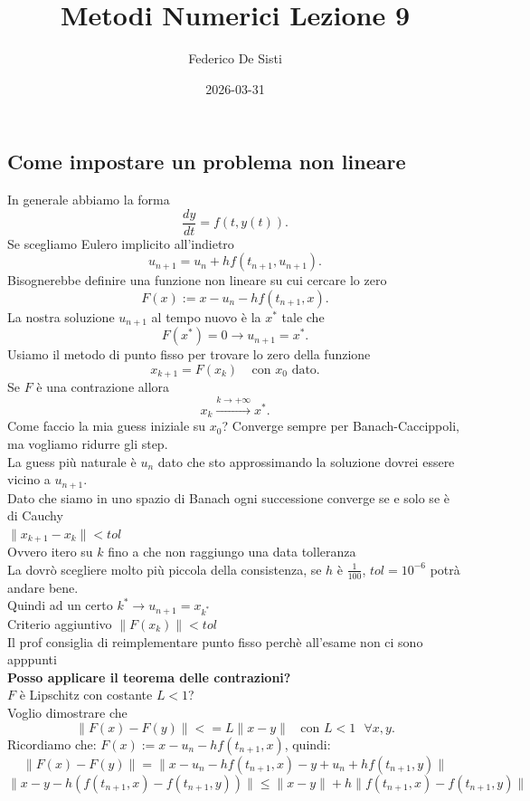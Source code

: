 \documentclass[12px]{article}
\title{Metodi Numerici Lezione 9}
\date{2026-03-31}
\author{Federico De Sisti}
\begin{document}
	\maketitle
	\newpage
	\subsection{Come impostare un problema non lineare}
	In generale abbiamo la forma 
	\[
		\frac{dy}{dt} =f (t,y(t))
	.\] 
	Se scegliamo Eulero implicito all'indietro
	\[
		u_{n+1} = u_n + hf(t_{n+1},u_{n+1})
	.\] 
	Bisognerebbe definire una funzione non lineare su cui cercare lo zero
	\[
		F(x) :=  x - u_n - hf(t_{n+1},x)
	.\] 
	La nostra soluzione $u_{n+1}$ al tempo nuovo è la  $x^*$ tale che
	\[
		F(x^*) = 0 \rightarrow u_{n+1} = x^*
	.\] 
	Usiamo il metodo di punto fisso per trovare lo zero della funzione
	\[
		x_{k+1} = F(x_k) \ \ \ \ \ \text{con }x_0 \text{ dato}
	.\] 
	Se $F$ è una contrazione allora
	\[
		x_k \xrightarrow{k \rightarrow +\infty} x^*
	.\] 
	Come faccio la mia guess iniziale su $x_0$? Converge sempre per Banach-Caccippoli, ma vogliamo ridurre gli step.\\
	La guess più naturale è $u_n$ dato che sto approssimando la soluzione dovrei essere vicino a  $u_{n+1}$.\\
	Dato che siamo in uno spazio di Banach ogni successione converge se e solo se è di Cauchy\\
	$\|x_{k+1}-x_k\| < tol$ \\
	Ovvero itero su $k$ fino a che non raggiungo una data tolleranza\\
	La dovrò scegliere molto più piccola della consistenza, se $h$ è $\frac 1 {100}$,  $tol = 10^{-6}$ potrà andare bene.\\
	Quindi  ad un certo $k^* \rightarrow u_{n+1} = x_{k^*}$\\
	Criterio aggiuntivo $\|F(x_k)\|<tol$\\
	Il prof consiglia di reimplementare punto fisso perchè all'esame non ci sono apppunti\\
	\textbf{Posso applicare il teorema delle contrazioni?}\\
	$F$ è Lipschitz con costante $L < 1$?\\
	Voglio dimostrare che 
	\[
		\|F(x) - F(y)\| <= L\|x-y\| \ \ \ \ \text{con } L < 1 \ \ \ \forall x,y
	.\] 
	 Ricordiamo che:
	 $F(x) :=  x - u_n - hf(t_{n+1},x)$, quindi:
	 \[
	 \|F(x) - F(y)\| = \|x - u_n - hf(t_{n+1},x) - y + u_n + hf(t_{n+1},y)\|
	 \] 
	 \[
		 \|x - y - h(f(t_{n+1},x) - f(t_{n+1},y))\|\leq \|x-y\| + h\|f(t_{n+1},x) - f(t_{n+1}, y)\|
	 \] 
\end{document}
